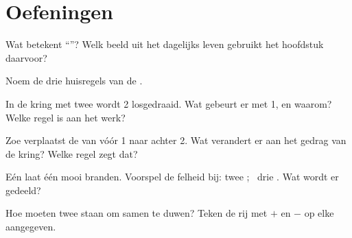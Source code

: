 \section{Oefeningen}

\begin{exercise}[$\star$]\label{exo:g4:series-circuits:1}
Wat betekent ``''? Welk beeld uit het dagelijks leven gebruikt
het hoofdstuk daarvoor?
\end{exercise}

\begin{exercise}[$\star$]\label{exo:g4:series-circuits:2}
Noem de drie huisregels van de .
\end{exercise}

\begin{exercise}[$\star$]\label{exo:g4:series-circuits:3}
In de kring met twee  wordt  2 losgedraaid. Wat gebeurt
er met  1, en waarom? Welke regel is aan het werk?
\end{exercise}

\begin{exercise}[$\star$]\label{exo:g4:series-circuits:4}
Zoe verplaatst de  van vóór  1 naar achter
 2. Wat verandert er aan het gedrag van de kring? Welke regel
zegt dat?
\end{exercise}

\begin{exercise}[$\star$]\label{exo:g4:series-circuits:5}
Eén  laat één  mooi branden. Voorspel de felheid
bij: twee  ; \ drie  . Wat wordt er
gedeeld?
\end{exercise}

\begin{exercise}[$\star$]\label{exo:g4:series-circuits:6}
Hoe moeten twee  staan om samen te duwen? Teken de rij met
$+$ en $-$ op elke  aangegeven.
\end{exercise}


